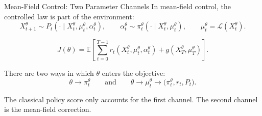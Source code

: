\documentclass[9pt]{beamer}
\def\E{{\mathbb E}}
\newcommand{\Law}{\mathcal L}
\begin{document}
\begin{frame}{Mean-Field Control: Two Parameter Channels}
\small
In mean-field control, the controlled law is part of the environment:
\[
  X_{t+1}^{\theta}\sim P_t(\cdot\mid X_t^\theta,\mu_t^\theta,\alpha_t^\theta),
  \qquad
  \alpha_t^\theta\sim\pi_t^\theta(\cdot\mid X_t^\theta,\mu_t^\theta),
  \qquad
  \mu_t^\theta=\Law(X_t^\theta).
\]

\[
  J(\theta)=
  \E\!\left[
    \sum_{t=0}^{T-1} r_t(X_t^\theta,\mu_t^\theta,\alpha_t^\theta)
    +g(X_T^\theta,\mu_T^\theta)
  \right].
\]

\vspace{0.15cm}
There are two ways in which $\theta$ enters the objective:
\[
\theta\longrightarrow \pi_t^\theta
\qquad\text{and}\qquad
\theta\longrightarrow \mu_t^\theta\longrightarrow
\big(\pi_t^\theta,r_t,P_t\big).
\]

\vspace{0.15cm}
The classical policy score only accounts for the first channel. The second channel is the mean-field correction.

\end{frame}
\end{document}
